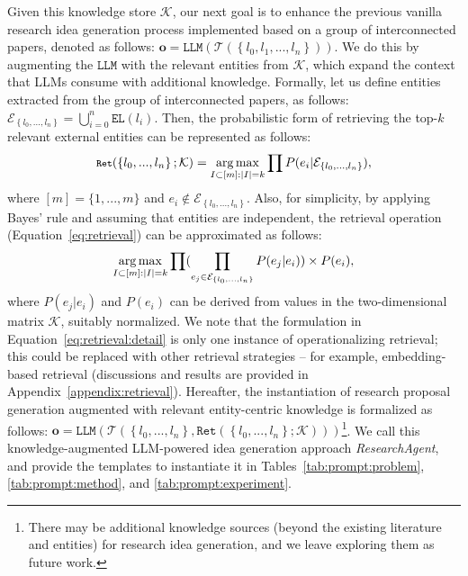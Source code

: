 \documentclass[11pt]{article}
\def\vo{{\bm{o}}}
\DeclareMathOperator*{\argmax}{arg\,max}
\begin{document}
Given this knowledge store $\mathcal{K}$, our next goal is to enhance the previous vanilla research idea generation process implemented based on a group of interconnected papers, denoted as follows: $\vo = \texttt{LLM}(\mathcal{T}(\left\{ l_0, l_1, ..., l_n \right\}))$. We do this by augmenting the $\texttt{LLM}$ with the relevant entities from $\mathcal{K}$, which expand the context that LLMs consume with additional knowledge. Formally, let us define entities extracted from the group of interconnected papers, as follows: $\mathcal{E}_{\left\{ l_0, ..., l_n \right\}} = \bigcup_{i=0}^{n} \texttt{EL}(l_i)$. Then, the probabilistic form of retrieving the top-$k$ relevant external entities can be represented as follows: 
\begin{equation}
\fontsize{8pt}{8pt}\selectfont
    \texttt{Ret}(\left\{ l_0, ..., l_n \right\}; \mathcal{K}) = \argmax_{I \subset [m]: |I| = k } \prod {P(e_i | \mathcal{E}_{\left\{ l_0, ..., l_n \right\}})},
    \label{eq:retrieval}
\fontsize{8pt}{8pt}\selectfont
\end{equation}
where $ [m] = \{1, ..., m\} $ and $e_i \notin \mathcal{E}_{\left\{ l_0, ..., l_n \right\}}$. Also, for simplicity, by applying Bayes' rule and assuming that entities are independent, the retrieval operation (Equation~\ref{eq:retrieval}) can be approximated as follows:
\begin{equation}
\fontsize{8.5pt}{8.5pt}\selectfont
    \argmax_{I \subset [m]: |I| = k } \prod ({\prod_{e_j \in \mathcal{E}_{\left\{ l_0, ..., l_n \right\}}} P(e_j | e_i)}) \times P(e_i),
    \label{eq:retrieval:detail}
\fontsize{8.5pt}{8.5pt}\selectfont
\end{equation}
where $P(e_j | e_i)$ and $P(e_i)$ can be derived from values in the two-dimensional matrix $\mathcal{K}$, suitably normalized. We note that the formulation in Equation~\ref{eq:retrieval:detail} is only one instance of operationalizing retrieval; this could be replaced with other retrieval strategies -- for example, embedding-based retrieval (discussions and results are provided in Appendix~\ref{appendix:retrieval}). Hereafter, the instantiation of research proposal generation augmented with relevant entity-centric knowledge is formalized as follows: $\vo = \texttt{LLM} (\mathcal{T}(\left\{ l_0, ..., l_n \right\}, \texttt{Ret}(\left\{ l_0, ..., l_n \right\}; \mathcal{K})))$\footnote{There may be additional knowledge sources (beyond the existing literature and entities) for research idea generation, and we leave exploring them as future work.}. We call this knowledge-augmented LLM-powered idea generation approach \emph{ResearchAgent}, and provide the templates to instantiate it in Tables~\ref{tab:prompt:problem}, \ref{tab:prompt:method}, and \ref{tab:prompt:experiment}.
\end{document}
